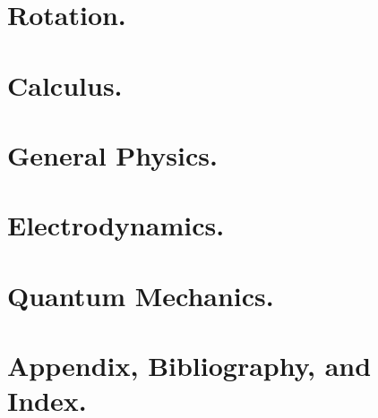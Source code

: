 \documentclass[12pt,leqno]{book}
\begin{document}
\part{Rotation.}





\part{Calculus.}





\part{General Physics.}









\part{Electrodynamics.}


\part{Quantum Mechanics.}
\part{Appendix, Bibliography, and Index.}


%





\end{document}
